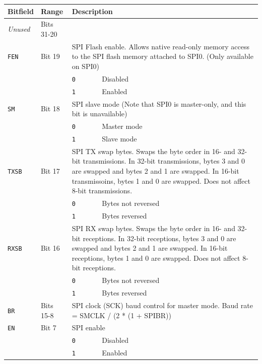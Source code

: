 \begin{tabularx}{\textwidth}{ l l l X }
\textbf{Bitfield} & \textbf{Range} & \multicolumn{2}{X}{\textbf{Description}} \\ \hline
\textit{Unused} & Bits 31-20 & \multicolumn{2}{X}{} \\
\hline
\texttt{FEN} & Bit 19 & \multicolumn{2}{X}{SPI Flash enable. Allows native read-only memory access to the SPI flash memory attached to SPI0. (Only available on SPI0)} \\
 & & \texttt{0} & Disabled \\
 & & \cellcolor{tablehighlightcolor}\texttt{1} & \cellcolor{tablehighlightcolor}Enabled \\
\hline
\texttt{SM} & Bit 18 & \multicolumn{2}{X}{SPI slave mode (Note that SPI0 is master-only, and this bit is unavailable)} \\
 & & \texttt{0} & Master mode \\
 & & \cellcolor{tablehighlightcolor}\texttt{1} & \cellcolor{tablehighlightcolor}Slave mode \\
\hline
\texttt{TXSB} & Bit 17 & \multicolumn{2}{X}{SPI TX swap bytes. Swaps the byte order in 16- and 32-bit transmissions. In 32-bit transmissions, bytes 3 and 0 are swapped and bytes 2 and 1 are swapped. In 16-bit transmissoins, bytes 1 and 0 are swapped. Does not affect 8-bit transmissions.} \\
 & & \texttt{0} & Bytes not reversed \\
 & & \cellcolor{tablehighlightcolor}\texttt{1} & \cellcolor{tablehighlightcolor}Bytes reversed \\
\hline
\texttt{RXSB} & Bit 16 & \multicolumn{2}{X}{SPI RX swap bytes. Swaps the byte order in 16- and 32-bit receptions. In 32-bit receptions, bytes 3 and 0 are swapped and bytes 2 and 1 are swapped. In 16-bit receptions, bytes 1 and 0 are swapped. Does not affect 8-bit receptions.} \\
 & & \texttt{0} & Bytes not reversed \\
 & & \cellcolor{tablehighlightcolor}\texttt{1} & \cellcolor{tablehighlightcolor}Bytes reversed \\
\hline
\texttt{BR} & Bits 15-8 & \multicolumn{2}{X}{SPI clock (SCK) baud control for master mode. Baud rate = SMCLK / (2 * (1 + SPIBR))} \\
\hline
\texttt{EN} & Bit 7 & \multicolumn{2}{X}{SPI enable} \\
 & & \texttt{0} & Disabled \\
 & & \cellcolor{tablehighlightcolor}\texttt{1} & \cellcolor{tablehighlightcolor}Enabled \\

\end{tabularx}
